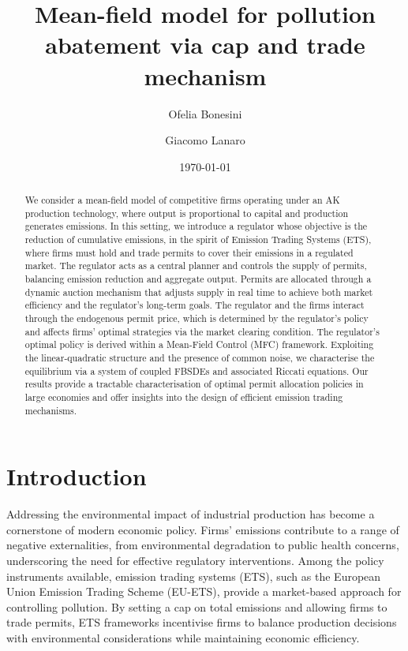 \documentclass[11pt,twoside]{amsart}
\title[Mean-field model for pollution abatement through ETS system]{Mean-field model for pollution abatement via cap and trade mechanism}
\author[O. Bonesini]{Ofelia Bonesini}\address{London School of Economics and Political Science, LSE, London}\email{o.bonesini@lse.ac.uk}
\author[G. Lanaro]{Giacomo Lanaro}\address{Prometeia SPA, Milan, Italy}\email{giacomo.lanaro94@gmail.com}
\date{\today}
\theoremstyle{definition}
\numberwithin{equation}{section}
\begin{document}
\begin{abstract}

We consider a mean-field model of competitive firms operating under an AK production technology, where output is proportional to capital and production generates emissions. In this setting, we introduce a regulator whose objective is the reduction of cumulative emissions, in the spirit of Emission Trading Systems (ETS), where firms must hold and trade permits to cover their emissions in a regulated market.
The regulator acts as a central planner and controls the supply of permits, balancing emission reduction and aggregate output. Permits are allocated through a dynamic auction mechanism that adjusts supply in real time to achieve both market efficiency and the regulator’s long-term goals. The regulator and the firms interact through the endogenous permit price, which is determined by the regulator’s policy and affects firms’ optimal strategies via the market clearing condition.
The regulator’s optimal policy is derived within a Mean-Field Control (MFC) framework. Exploiting the linear-quadratic structure and the presence of common noise, we characterise the equilibrium via a system of coupled FBSDEs and associated Riccati equations.
Our results provide a tractable characterisation of optimal permit allocation policies in large economies and offer insights into the design of efficient emission trading mechanisms.
\end{abstract}

\maketitle
\section{Introduction}
\label{section: introduction}
Addressing the environmental impact of industrial production has become a cornerstone of modern economic policy. Firms’ emissions contribute to a range of negative externalities, from environmental degradation to public health concerns, underscoring the need for effective regulatory interventions. Among the policy instruments available, emission trading systems (ETS), such as the European Union Emission Trading Scheme (EU-ETS), provide a market-based approach for controlling pollution. By setting a cap on total emissions and allowing firms to trade permits, ETS frameworks incentivise firms to balance production decisions with environmental considerations while maintaining economic efficiency.
\end{document}
